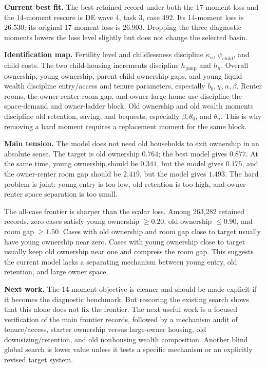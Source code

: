 \documentclass[10pt]{article}
\begin{document}
\textbf{Current best fit.}
The best retained record under both the 17-moment loss and the 14-moment rescore
is DE wave 4, task 3, case 492. Its 14-moment loss is \(26.530\); its original
17-moment loss is \(26.903\). Dropping the three diagnostic moments lowers the
loss level slightly but does not change the selected basin.

\textbf{Identification map.}
Fertility level and childlessness discipline \(\kappa_n\),
\(\psi_{\mathrm{child}}\), and child costs. The two child-housing increments
discipline \(\bar h_{\mathrm{jump}}\) and \(\bar h_n\). Overall ownership,
young ownership, parent-child ownership gaps, and young liquid wealth discipline
entry/access and tenure parameters, especially \(b_0,\chi,\alpha,\beta\).
Renter rooms, the owner-renter room gap, and owner large-home use discipline the
space-demand and owner-ladder block. Old ownership and old wealth moments
discipline old retention, saving, and bequests, especially \(\beta,\theta_0\),
and \(\theta_n\). This is why removing a hard moment requires a replacement
moment for the same block.

\textbf{Main tension.}
The model does not need old households to exit ownership in an absolute sense.
The target is old ownership \(0.764\); the best model gives \(0.877\). At the
same time, young ownership should be \(0.341\), but the model gives \(0.175\),
and the owner-renter room gap should be \(2.419\), but the model gives \(1.493\).
The hard problem is joint: young entry is too low, old retention is too high,
and owner-renter space separation is too small.

The all-case frontier is sharper than the scalar loss. Among 263,282 retained
records, zero cases satisfy young ownership \(\ge 0.20\), old ownership
\(\le 0.90\), and room gap \(\ge 1.50\). Cases with old ownership and room gap
close to target usually have young ownership near zero. Cases with young
ownership close to target usually keep old ownership near one and compress the
room gap. This suggests the current model lacks a separating mechanism between
young entry, old retention, and large owner space.

\textbf{Next work.}
The 14-moment objective is cleaner and should be made explicit if it becomes
the diagnostic benchmark. But rescoring the existing search shows that this
alone does not fix the frontier. The next useful work is a focused verification
of the main frontier records, followed by a mechanism audit of tenure/access,
starter ownership versus large-owner housing, old downsizing/retention, and
old nonhousing wealth composition. Another blind global search is lower value
unless it tests a specific mechanism or an explicitly revised target system.
\end{document}
